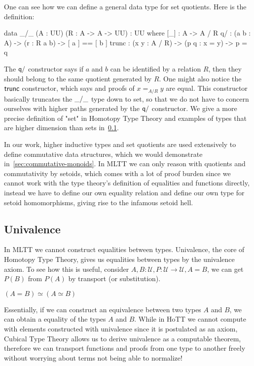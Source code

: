 \begin{toappendix}
One can see how we can define a general data type for set quotients. Here is the definition:
\vspace{-1em}
\begin{code}
data _/_ (A : UU) (R : A -> A -> UU) : UU where
    [_]  : A -> A / R
    q/ : (a b : A) -> (r : R a b) -> [ a ] == [ b ]
    trunc : (x y : A / R) -> (p q : x = y) -> p = q
\end{code}
\vspace{1em}

The $\operatorname{\mathsf{q/}}$ constructor says if $a$ and $b$ can be identified by a relation $R$, then
they should belong to the same quotient generated by $R$.
One might also notice the $\operatorname{\mathsf{trunc}}$ constructor, which says and proofs of $x =_{A/R} y$ are equal.
This constructor basically truncates the $\operatorname{\mathsf{\_/\_}}$ type down to set, so that we do not have to
concern ourselves with higher paths generated by the $\operatorname{\mathsf{q/}}$ constructor.
We give a more precise definition of "set" in Homotopy Type Theory and examples of types that are
higher dimension than sets in~\cref{types:univalence}.

In our work, higher inductive types and set quotients are used extensively to define commutative
data structures, which we would demonstrate in~\cref{sec:commutative-monoids}. In MLTT we can only
reason with quotients and commutativity by setoids, which comes with a lot of proof burden
since we cannot work with the type theory's definition of equalities and functions directly,
instead we have to define our own equality relation and define our own type for setoid homomorphisms,
giving rise to the infamous setoid hell.

\subsection{Univalence}\label{types:univalence}
In MLTT we cannot construct equalities between types. Univalence, the core of Homotopy Type Theory,
gives us equalities between types by the univalence axiom. To see how this is useful,
consider $A, B : \mathcal{U}, P : \mathcal{U} \rightarrow \mathcal{U}, A = B$, we can
get $P(B)$ from $P(A)$ by transport (or substitution).  

\begin{definition}
    $(A = B) \simeq (A \simeq B)$
\end{definition}
Essentially, if we can construct an equivalence between two types $A$ and $B$,
we can obtain a equality of the types $A$ and $B$. While in HoTT we cannot
compute with elements constructed with univalence since it is postulated as an
axiom, Cubical Type Theory allows us to derive univalence as a computable
theorem, therefore we can transport functions and proofs from one type to
another freely without worrying about terms not being able to normalize!


\end{toappendix}
